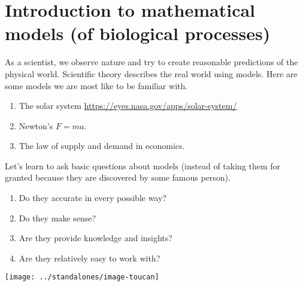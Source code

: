 \documentclass[../main.tex]{subfiles}
\begin{document}
 \section{Introduction to mathematical models (of biological processes)}

As a scientist, we observe nature and try to create reasonable predictions of the physical world. Scientific theory describes the real world using models. Here are some models we are most like to be familiar with.

\begin{enumerate}
  \item The solar system \url{https://eyes.nasa.gov/apps/solar-system/}
  \item Newton's \(F = ma\).
  \item The law of supply and demand in economics.
\end{enumerate}

Let's learn to ask basic questions about models (instead of taking them for granted because they are discovered by some famous person).
\begin{enumerate}[wide]
  \item Do they accurate in every possible way? 


  \item Do they make sense? 


  \item Are they provide knowledge and insights? 


  \item Are they relatively easy to work with? 

\end{enumerate}

\clearpage
\vspace{-1in}
\centerline{\texttt{[image: ../standalones/image-toucan]}}
\end{document}
